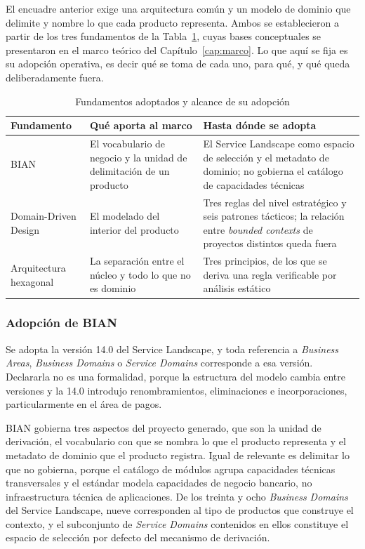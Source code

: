 El encuadre anterior exige una arquitectura común y un modelo de dominio que
delimite y nombre lo que cada producto representa. Ambos se establecieron a
partir de los tres fundamentos de la Tabla~\ref{tab:fundamentos}, cuyas bases
conceptuales se presentaron en el marco teórico del Capítulo~\ref{cap:marco}.
Lo que aquí se fija es su adopción operativa, es decir qué se toma de cada uno,
para qué, y qué queda deliberadamente fuera.

\begin{table}[H]
\centering
{\footnotesize
\begin{tabular}{p{3.3cm}p{5.5cm}p{5.9cm}}
\toprule
\textbf{Fundamento} & \textbf{Qué aporta al marco} & \textbf{Hasta dónde se adopta} \\
\midrule
BIAN & El vocabulario de negocio y la unidad de delimitación de un producto & El Service Landscape como espacio de selección y el metadato de dominio; no gobierna el catálogo de capacidades técnicas \\
Domain-Driven Design & El modelado del interior del producto & Tres reglas del nivel estratégico y seis patrones tácticos; la relación entre \emph{bounded contexts} de proyectos distintos queda fuera \\
Arquitectura hexagonal & La separación entre el núcleo y todo lo que no es dominio & Tres principios, de los que se deriva una regla verificable por análisis estático \\
\bottomrule
\end{tabular}
}
\caption{Fundamentos adoptados y alcance de su adopción}
\label{tab:fundamentos}
\end{table}

\subsubsection*{Adopción de BIAN}

Se adopta la versión 14.0 del Service Landscape, y toda referencia a
\emph{Business Areas}, \emph{Business Domains} o \emph{Service Domains}
corresponde a esa versión. Declararla no es una formalidad, porque la
estructura del modelo cambia entre versiones y la 14.0 introdujo
renombramientos, eliminaciones e incorporaciones, particularmente en el área
de pagos.

BIAN gobierna tres aspectos del proyecto generado, que son la unidad de
derivación, el vocabulario con que se nombra lo que el producto representa y
el metadato de dominio que el producto registra. Igual de relevante es
delimitar lo que no gobierna, porque el catálogo de módulos agrupa
capacidades técnicas transversales y el estándar modela capacidades de
negocio bancario, no infraestructura técnica de aplicaciones. De los treinta
y ocho \emph{Business Domains} del Service Landscape, nueve corresponden al
tipo de productos que construye el contexto, y el subconjunto de
\emph{Service Domains} contenidos en ellos constituye el espacio de selección
por defecto del mecanismo de derivación.

